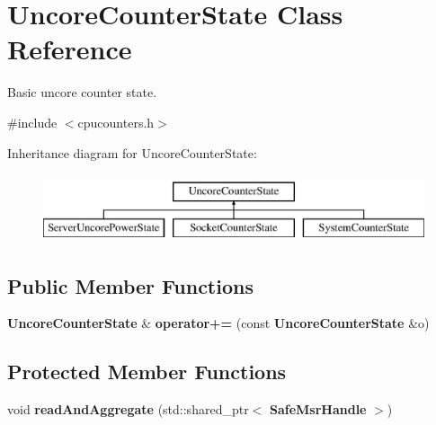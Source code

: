 \section{Uncore\+Counter\+State Class Reference}
\label{classUncoreCounterState}


Basic uncore counter state.  




{\ttfamily \#include $<$cpucounters.\+h$>$}

Inheritance diagram for Uncore\+Counter\+State\+:\begin{figure}[H]
\begin{center}
\leavevmode
\includegraphics[height=2.000000cm]{classUncoreCounterState}
\end{center}
\end{figure}
\subsection*{Public Member Functions}
\begin{DoxyCompactItemize}
\item 
{\bf Uncore\+Counter\+State} \& {\bfseries operator+=} (const {\bf Uncore\+Counter\+State} \&o)\label{classUncoreCounterState_a96eb270d92f202a85ed11ded8cf60f71}

\end{DoxyCompactItemize}
\subsection*{Protected Member Functions}
\begin{DoxyCompactItemize}
\item 
void {\bfseries read\+And\+Aggregate} (std\+::shared\+\_\+ptr$<$ {\bf Safe\+Msr\+Handle} $>$)\label{classUncoreCounterState_a2583a9807bb67e008e6ffde1cd13850f}

\end{DoxyCompactItemize}
